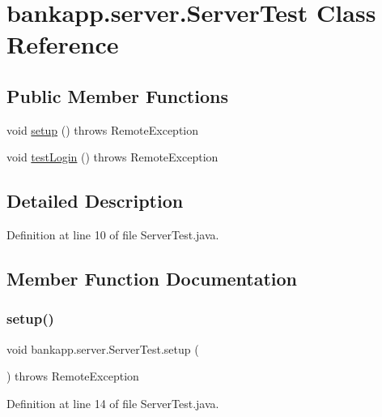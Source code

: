 \hypertarget{classbankapp_1_1server_1_1_server_test}{}\section{bankapp.\+server.\+Server\+Test Class Reference}
\label{classbankapp_1_1server_1_1_server_test}
\subsection*{Public Member Functions}
\begin{DoxyCompactItemize}
\item 
void \hyperlink{classbankapp_1_1server_1_1_server_test_a68347d33d8e02d6ea3fa24131b25b5e8}{setup} ()  throws Remote\+Exception
\item 
void \hyperlink{classbankapp_1_1server_1_1_server_test_a810f794baa2275cad3d67c34362b0358}{test\+Login} ()  throws Remote\+Exception
\end{DoxyCompactItemize}


\subsection{Detailed Description}


Definition at line 10 of file Server\+Test.\+java.



\subsection{Member Function Documentation}
\mbox{\label{classbankapp_1_1server_1_1_server_test_a68347d33d8e02d6ea3fa24131b25b5e8}} 
\subsubsection{\texorpdfstring{setup()}{setup()}}
{\footnotesize\ttfamily void bankapp.\+server.\+Server\+Test.\+setup (\begin{DoxyParamCaption}{ }\end{DoxyParamCaption}) throws Remote\+Exception}



Definition at line 14 of file Server\+Test.\+java.

